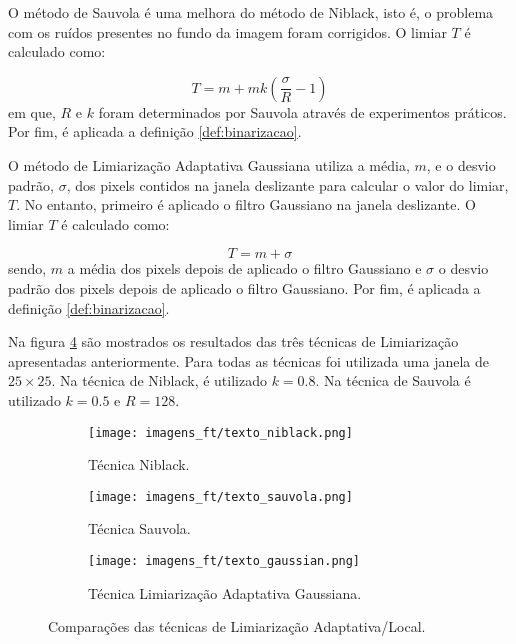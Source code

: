 O método de Sauvola é uma melhora do método de Niblack, isto é, o problema com os ruídos presentes no fundo da imagem foram corrigidos. O limiar $T$ é calculado como:

\begin{equation}
	T = m + mk\left(\frac{\sigma}{R} - 1\right)
\end{equation}
em que, $R$ e $k$ foram determinados por Sauvola através de experimentos práticos. Por fim, é aplicada a definição \ref{def:binarizacao}.

O método de Limiarização Adaptativa Gaussiana utiliza a média, $m$, e o desvio padrão, $\sigma$, dos pixels contidos na janela deslizante para calcular o valor do limiar, $T$. No entanto, primeiro é aplicado o filtro Gaussiano na janela deslizante. O limiar $T$ é calculado como:

\begin{equation}
	T = m + \sigma
\end{equation}
sendo, $m$ a média dos pixels depois de aplicado o filtro Gaussiano e $\sigma$ o desvio padrão dos pixels depois de aplicado o filtro Gaussiano. Por fim, é aplicada a definição \ref{def:binarizacao}.

Na figura \ref{fig:texto_limiarizacao} são mostrados os resultados das três técnicas de Limiarização apresentadas anteriormente. Para todas as técnicas foi utilizada uma janela de $25 \times 25$. Na técnica de Niblack, é utilizado $k = 0.8$. Na técnica de Sauvola é utilizado $k = 0.5$ e $R = 128$. 

\begin{figure}[h]
	\centering
	\begin{subfigure}[b]{0.45\textwidth}
		\centering
		\texttt{[image: imagens\_ft/texto\_niblack.png]}
		\caption{Técnica Niblack.}
		\label{fig:texto_Niblack}
	\end{subfigure}
	\hfill
	\begin{subfigure}[b]{0.45\textwidth}
		\centering
		\texttt{[image: imagens\_ft/texto\_sauvola.png]}
		\caption{Técnica Sauvola.}
		\label{fig:texto_Sauvola}
	\end{subfigure}
	\hfill
	\begin{subfigure}[b]{0.45\textwidth}
		\centering
		\texttt{[image: imagens\_ft/texto\_gaussian.png]}
		\caption{Técnica Limiarização Adaptativa Gaussiana.}
		\label{fig:texto_Gaussiana}
	\end{subfigure}
	\caption{Comparações das técnicas de Limiarização Adaptativa/Local.}
	\label{fig:texto_limiarizacao}
\end{figure}

